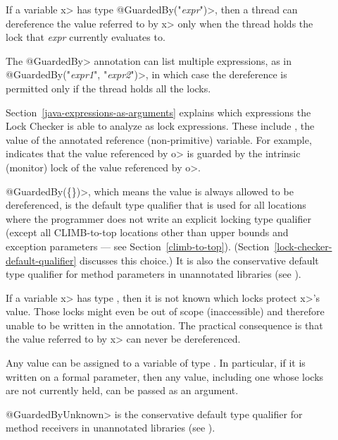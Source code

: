 \begin{description}

\item[]
  If a variable \<x> has type \<@GuardedBy("\emph{expr}")>, then a thread can
  dereference the value referred to by \<x> only when the thread holds the
  lock that \emph{expr} currently evaluates to.

  The \<@GuardedBy> annotation can list multiple expressions, as in
  \<@GuardedBy(\ttlcb"\emph{expr1}", "\emph{expr2}"\ttrcb)>, in which case
  the dereference is
  permitted only if the thread holds all the locks.

  Section~\ref{java-expressions-as-arguments} explains which
  expressions the Lock Checker is able to analyze as lock expressions.
  These include , the value of the annotated reference
  (non-primitive) variable.  For example, 
  indicates that the value referenced by \<o> is guarded by the intrinsic
  (monitor) lock of the value referenced by \<o>.

  \<@GuardedBy(\{\})>, which means the value is always allowed to be
  dereferenced, is the default type qualifier that is used for all locations
  where the programmer does not
  write an explicit locking type qualifier (except all CLIMB-to-top locations
  other than upper bounds and exception parameters --- see Section~\ref{climb-to-top}).
  (Section~\ref{lock-checker-default-qualifier} discusses this choice.)
  It is also the conservative
  default type qualifier for method parameters in unannotated libraries
  (see ).

\item[]
  If a variable \<x> has type , then
  it is not known which locks protect \<x>'s value.  Those locks might
  even be out of scope (inaccessible) and therefore unable to be written
  in the annotation.
  The practical consequence is that
  the value referred to by \<x> can never be dereferenced.

  Any value can be assigned to a variable of type
  .  In particular, if it is written on a
  formal parameter, then any value,
  including one whose locks are not currently held,
  can be passed as an argument.

  \<@GuardedByUnknown> is the conservative
  default type qualifier for method receivers in unannotated libraries
  (see ).


\end{description}

